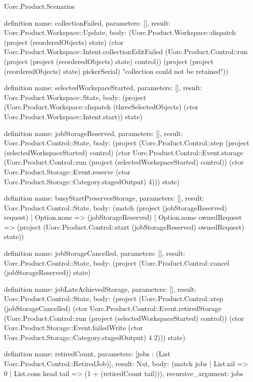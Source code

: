 \begin{lexlean}{Uorc.Product.Scenarios}
\begin{semanticmodule}
definition{
  name: collectionFailed,
  parameters: [],
  result: Uorc.Product.Workspace::Update,
  body: (Uorc.Product.Workspace::dispatch (project (reorderedObjects) state) (ctor Uorc.Product.Workspace::Intent.collectionEditFailed (Uorc.Product.Control::run (project (project (reorderedObjects) state) control)) (project (project (reorderedObjects) state) pickerSerial) "collection could not be retained"))
}

definition{
  name: selectedWorkspaceStarted,
  parameters: [],
  result: Uorc.Product.Workspace::State,
  body: (project (Uorc.Product.Workspace::dispatch (threeSelectedObjects) (ctor Uorc.Product.Workspace::Intent.start)) state)
}

definition{
  name: jobStorageReserved,
  parameters: [],
  result: Uorc.Product.Control::State,
  body: (project (Uorc.Product.Control::step (project (selectedWorkspaceStarted) control) (ctor Uorc.Product.Control::Event.storage (Uorc.Product.Control::run (project (selectedWorkspaceStarted) control)) (ctor Uorc.Product.Storage::Event.reserve (ctor Uorc.Product.Storage::Category.stagedOutput) 4))) state)
}

definition{
  name: busyStartPreservesStorage,
  parameters: [],
  result: Uorc.Product.Control::State,
  body: (match (project (jobStorageReserved) request)
    | Option.none => (jobStorageReserved)
    | Option.some ownedRequest => (project (Uorc.Product.Control::start (jobStorageReserved) ownedRequest) state))
}

definition{
  name: jobStorageCancelled,
  parameters: [],
  result: Uorc.Product.Control::State,
  body: (project (Uorc.Product.Control::cancel (jobStorageReserved)) state)
}

definition{
  name: jobLateAchievedStorage,
  parameters: [],
  result: Uorc.Product.Control::State,
  body: (project (Uorc.Product.Control::step (jobStorageCancelled) (ctor Uorc.Product.Control::Event.retiredStorage (Uorc.Product.Control::run (project (selectedWorkspaceStarted) control)) (ctor Uorc.Product.Storage::Event.failedWrite (ctor Uorc.Product.Storage::Category.stagedOutput) 4 2))) state)
}

definition{
  name: retiredCount,
  parameters: [jobs : (List Uorc.Product.Control::RetiredJob)],
  result: Nat,
  body: (match jobs | List.nil => 0 | List.cons head tail => (1 + (retiredCount tail))),
  recursive_argument: jobs
}


\end{semanticmodule}
\end{lexlean}
